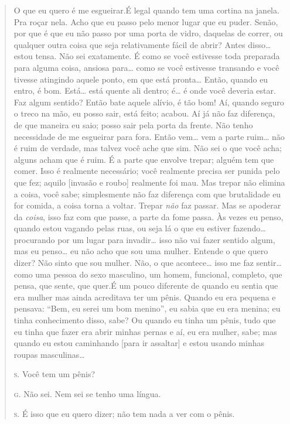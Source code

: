 \begin{quote}
O que eu quero é me esgueirar.\idxidenhis[|(] É legal quando tem uma cortina na
janela. Pra roçar nela. Acho que eu passo pelo menor lugar que eu
puder. Senão, por que é que eu não passo por uma porta de vidro,
daquelas de correr, ou qualquer outra coisa que seja relativamente
fácil de abrir? Antes disso\ldots{} estou tensa. Não sei exatamente. É como
se você estivesse toda preparada para alguma coisa, ansiosa para\ldots{}
como se você estivesse transando e você tivesse atingindo aquele ponto,
em que está pronta\ldots{} Então, quando eu entro, é bom. Está\ldots{} está
quente ali dentro; é\ldots{} é onde você deveria estar. Faz algum sentido?
Então bate aquele alívio, é tão bom! Aí, quando seguro o treco na mão,
eu posso sair, está feito; acabou. Aí já não faz diferença, de que
maneira eu saio; posso sair pela porta da frente. Não tenho necessidade
de me esgueirar para fora. Então vem\ldots{} vem a parte ruim\ldots{} não é ruim
de verdade, mas talvez você ache que sim. Não sei o que você acha;
alguns acham que é ruim. É a parte que envolve trepar; alguém tem que
comer. Isso é realmente necessário; você realmente precisa ser punida
pelo que fez; aquilo [invasão e roubo] realmente foi mau. Mas trepar
não elimina a coisa, você sabe; simplesmente não faz diferença com que
brutalidade eu for comida, a coisa torna a voltar. Trepar \textit{não}
faz passar. Mas se apoderar da \textit{coisa}, isso faz com que passe,
a parte da fome passa. Às vezes eu penso, quando estou vagando pelas
ruas, ou seja lá o que eu estiver fazendo\ldots{} procurando por um lugar
para invadir\ldots{} isso não vai fazer sentido algum, mas eu penso\ldots{} eu
não acho que sou uma mulher. Entende o que quero dizer? Não sinto que
sou mulher. Não, o que acontece\ldots{} isso me faz sentir\ldots{} como uma
pessoa do sexo masculino, um homem, funcional, completo, que pensa, que
sente, que quer.\idxiden[|(] É um pouco diferente de quando eu sentia que era
mulher mas ainda acreditava ter um pênis. Quando eu era pequena e
pensava: ``Bem, eu serei um bom menino'', eu
sabia que eu era menina; eu tinha conhecimento disso, sabe? Ou quando
eu tinha um pênis, tudo que eu tinha que fazer era abrir minhas pernas
e aí, eu era mulher, sabe; mas quando eu estou caminhando [para ir
assaltar] e estou usando minhas roupas masculinas\ldots{}

\noindent\hskip0mm\textsc{s.} Você tem um pênis?\idxpenisimag{}

\noindent\hskip0mm\textsc{g.} Não sei. Nem sei se tenho uma língua.

\noindent\hskip0mm\textsc{s.} É isso que eu quero dizer; não tem nada a ver com o pênis.


\end{quote}
